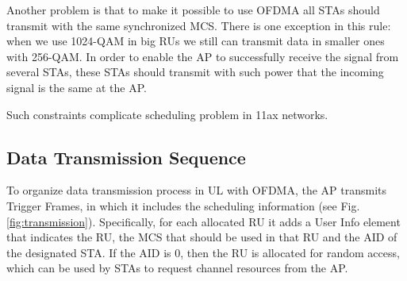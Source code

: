 Another problem is that to make it possible to use OFDMA all STAs should transmit with the same synchronized MCS. There is one exception in this rule: when we use 1024-QAM in big RUs we still can transmit data in smaller ones with 256-QAM. 
In order to enable the AP to successfully receive the signal from several STAs, these STAs should transmit with such power that the incoming signal is the same at the AP.

Such constraints complicate scheduling problem in 11ax networks.

\subsection{Data Transmission Sequence}
To organize data transmission process in UL with OFDMA, the AP transmits Trigger Frames, in which it includes the scheduling information (see Fig. \ref{fig:transmission}).
Specifically, for each allocated RU it adds a User Info element that indicates the RU, the MCS that should be used in that RU and the AID of the designated STA.
If the AID is $0$, then the RU is allocated for random access, which can be used by STAs to request channel resources from the AP.

